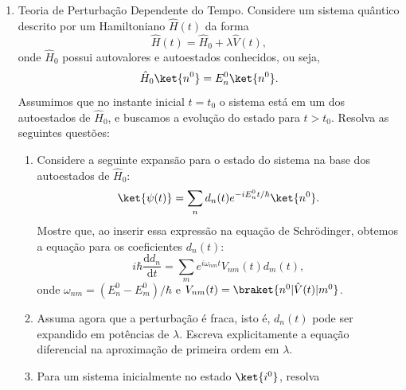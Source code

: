 \begin{enumerate}
$$	      $$
	      onde $p(x) = \sqrt{2m(E - V(x))}$ é o momento clássico da partícula. Resolva
	      as seguintes questões:
	      \begin{enumerate}
		      \item Substitua a ansatz WKB na equação de Schrödinger e derive a condição de
		            validade da aproximação WKB.
		      \item Considere o potencial harmônico $V(x) = \frac{1}{2} m \omega^2 x^2$.
		            Determine a quantização aproximada dos níveis de energia usando a
		            condição de quantização de Bohr-Sommerfeld:
		            $$
			            \oint p(x) dx = \left(n + \frac{1}{2}\right) h.
		            $$
		      \item Compare o resultado obtido com os níveis de energia exatos do
		            oscilador harmônico quântico e discuta a validade da aproximação WKB
		            nesse caso.
	      \end{enumerate}
	\item Teoria de Perturbação Dependente do Tempo. Considere um sistema quântico
	      descrito por um Hamiltoniano $\hat{H}(t)$ da forma
	      $$
		      \hat{H}(t) = \hat{H}_0 + \lambda \hat{V}(t),
	      $$
	      onde $\hat{H}_0$ possui autovalores e autoestados conhecidos, ou seja,
	      $$
		      \hat{H}_0 \ket{n^0} = E_n^0 \ket{n^0}.
	      $$
	      Assumimos que no instante inicial $t = t_0$ o sistema está em um dos autoestados
	      de $\hat{H}_0$, e buscamos a evolução do estado para $t > t_0$. Resolva as
	      seguintes questões:
	      \begin{enumerate}
		      \item Considere a seguinte expansão para o estado do sistema na base dos
		            autoestados de $\hat{H}_0$:
		            $$
			            \ket{\psi(t)} = \sum_n d_n(t) e^{-iE_n^0 t/\hbar} \ket{n^0}.
		            $$
		            Mostre que, ao inserir essa expressão na equação de Schrödinger,
		            obtemos a equação para os coeficientes $d_n(t)$:
		            $$
			            i\hbar \frac{\mathrm{d} d_n}{\mathrm{d}t} = \sum_m e^{i\omega_{nm} t} V_{nm}(t) d_m(t),
		            $$
		            onde $\omega_{nm} = (E_n^0 - E_m^0)/\hbar$ e $V_{nm}(t) = \braket{n^0 | \hat{V}(t) | m^0}$.
		      \item Assuma agora que a perturbação é fraca, isto é, $d_n(t)$ pode ser
		            expandido em potências de $\lambda$. Escreva explicitamente a equação
		            diferencial na aproximação de primeira ordem em $\lambda$.
		      \item Para um sistema inicialmente no estado $\ket{i^0}$, resolva

\end{enumerate}
\end{enumerate}
